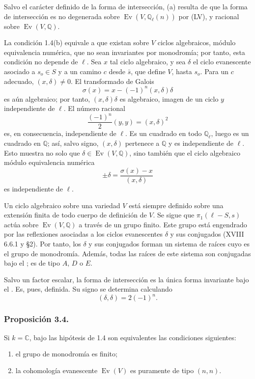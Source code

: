 Salvo el carácter definido de la forma de intersección, (a) resulta de
que la forma de intersección es no degenerada sobre
$\operatorname{Ev}(V,\mathbb Q_\ell(n))$ por (LV), y racional sobre
$\operatorname{Ev}(V,\mathbb Q)$.

La condición 1.4(b) equivale a que existan sobre $V$ ciclos algebraicos,
módulo equivalencia numérica, que no sean invariantes por monodromía;
por tanto, esta condición no depende de $\ell$. Sea $x$ tal ciclo
algebraico, y sea $\delta$ el ciclo evanescente asociado a
$s_o\in S$ y a un camino $c$ desde $\bar s$, que define $V$, hasta
$s_o$. Para un $c$ adecuado, $(x,\delta)\ne0$. El transformado de
Galois
\[
\sigma(x)=x-(-1)^n(x,\delta)\delta
\]
es aún algebraico; por tanto, $(x,\delta)\delta$ es algebraico, imagen
de un ciclo $y$ independiente de $\ell$. El número racional
\[
\frac{(-1)^n}{2}(y,y)=(x,\delta)^2
\]
es, en consecuencia, independiente de $\ell$. Es un cuadrado en todo
$\mathbb Q_\ell$, luego es un cuadrado en $\mathbb Q$; así, salvo
signo, $(x,\delta)$ pertenece a $\mathbb Q$ y es independiente de
$\ell$. Esto muestra no solo que
$\delta\in\operatorname{Ev}(V,\mathbb Q)$, sino también que el ciclo
algebraico módulo equivalencia numérica
\[
\pm\delta=\frac{\sigma(x)-x}{(x,\delta)}
\]
es independiente de $\ell$.

\pageoriginale

Un ciclo algebraico sobre una variedad $V$ está siempre definido sobre
una extensión finita de todo cuerpo de definición de $V$. Se sigue que
$\pi_1(\ell-S,s)$ actúa sobre $\operatorname{Ev}(V,\mathbb Q)$ a través
de un grupo finito. Este grupo está engendrado por las reflexiones
asociadas a los ciclos evanescentes $\delta$ y sus conjugados
(XVIII 6.6.1 y §2). Por tanto, los $\delta$ y sus conjugados forman un
sistema de raíces cuyo  es el grupo
de monodromía. Además, todas las raíces de este sistema son conjugadas
bajo el ; es de tipo $A$, $D$ o $E$.

Salvo un factor escalar, la forma de intersección es la única forma
invariante bajo el . Es, pues,
definida. Su signo se determina calculando
\[
(\delta,\delta)=2(-1)^n.
\]

\subsubsection*{Proposición 3.4.}

Si $k=\mathbb C$, bajo las hipótesis de 1.4 son equivalentes las
condiciones siguientes:
\begin{enumerate}[label=(\roman*)]
\item el grupo de monodromía es finito;
\item la cohomología evanescente $\operatorname{Ev}(V)$ es puramente
  de tipo $(n,n)$.
\end{enumerate}

